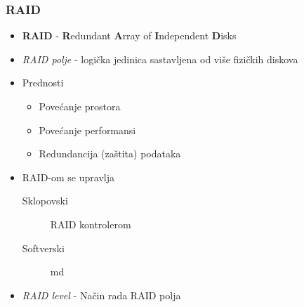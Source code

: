 \documentclass[t]{beamer}
\begin{document}
\begin{frame}
	\frametitle{RAID}
	\begin{itemize}
		\item \textbf{RAID} - \textbf{R}edundant \textbf{A}rray of \textbf{I}ndependent \textbf{D}isks
	\end{itemize}
	\begin{itemize}
		\item \emph{RAID polje} - logička jedinica sastavljena od više fizičkih diskova
		\item Prednosti
		\begin{itemize}
			\item Povećanje prostora
			\item Povećanje performansi
			\item Redundancija (zaštita) podataka
		\end{itemize}
	\end{itemize}
	\begin{itemize}
		\item RAID-om se upravlja
		\begin{description}
			\item[Sklopovski] RAID kontrolerom
			\item[Softverski] md
		\end{description}
	\end{itemize}
	\begin{itemize}
		\item \emph{RAID level} - Način rada RAID polja
	\end{itemize}
\end{frame}
\end{document}
